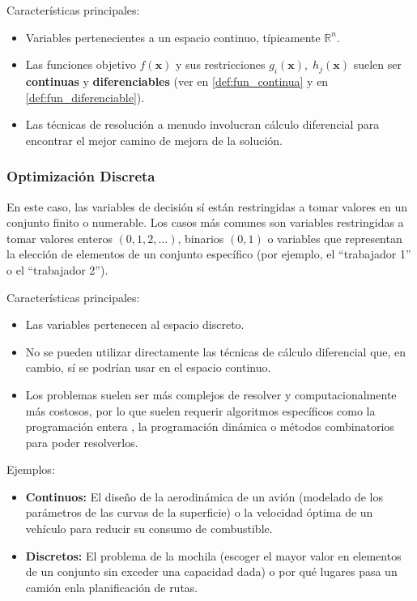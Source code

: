 \documentclass[12pt,a4paper]{book}
\begin{document}
Características principales:
\begin{itemize}
    \item Variables pertenecientes a un espacio continuo, típicamente $\mathbb{R}^n$.
    \item Las funciones objetivo $f(\mathbf{x})$ y sus restricciones $g_i(\mathbf{x}), \;h_j(\mathbf{x})$ suelen ser \textbf{continuas} y \textbf{diferenciables} (ver en \ref{def:fun_continua} y en \ref{def:fun_diferenciable}).
    \item Las técnicas de resolución a menudo involucran cálculo diferencial para encontrar el mejor camino de mejora de la solución.
\end{itemize}

\subsubsection{Optimización Discreta}
En este caso, las variables de decisión sí están restringidas a tomar valores en un conjunto finito o numerable. Los casos más comunes son variables restringidas a tomar valores enteros $(0,1,2,...)$, binarios $(0,1)$ o variables que representan la elección de elementos de un conjunto específico (por ejemplo, el ``trabajador 1'' o el ``trabajador 2'').

Características principales:
\begin{itemize}
    \item Las variables pertenecen al espacio discreto.
    \item No se pueden utilizar directamente las técnicas de cálculo diferencial que, en cambio, sí se podrían usar en el espacio continuo.
    \item Los problemas suelen ser más complejos de resolver y computacionalmente más costosos, por lo que suelen requerir algoritmos específicos como la programación entera \citep{int_programing}, la programación dinámica o métodos combinatorios para poder resolverlos.
\end{itemize}

Ejemplos:
\begin{itemize}
    \item \textbf{Continuos:} El diseño de la aerodinámica de un avión (modelado de los parámetros de las curvas de la superficie) o la velocidad óptima de un vehículo para reducir su consumo de combustible.
    \item \textbf{Discretos:} El problema de la mochila (escoger el mayor valor en elementos de un conjunto sin exceder una capacidad dada) o por qué lugares pasa un camión enla planificación de rutas.
\end{itemize}
\end{document}
